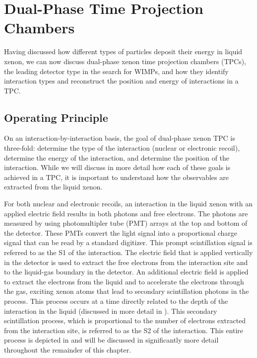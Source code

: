\section{Dual-Phase Time Projection Chambers}
\label{sec:lxe_tpc}

Having discussed how different types of particles deposit their energy in liquid xenon, we can now discuss dual-phase xenon time projection chambers (TPCs), the leading detector type in the search for WIMPs, and how they identify interaction types and reconstruct the position and energy of interactions in a TPC.



\subsection{Operating Principle}
\label{sec:tpc_operating_principle}

On an interaction-by-interaction basis, the goal of dual-phase xenon TPC is three-fold: determine the type of the interaction (nuclear or electronic recoil), determine the energy of the interaction, and determine the position of the interaction.  While we will discuss in more detail how each of these goals is achieved in a TPC, it is important to understand how the observables are extracted from the liquid xenon.  

For both nuclear and electronic recoils, an interaction in the liquid xenon with an applied electric field results in both photons and free electrons.  The photons are measured by using photomultipler tube (PMT) arrays at the top and bottom of the detector.  These PMTs convert the light signal into a proportional charge signal that can be read by a standard digitizer.  This prompt scintillation signal is referred to as the S1 of the interaction.  The electric field that is applied vertically in the detector is used to extract the free electrons from the interaction site and to the liquid-gas boundary in the detector.  An additional electric field is applied to extract the electrons from the liquid and to accelerate the electrons through the gas, exciting xenon atoms that lead to secondary scintillation photons in the process.  This process occurs at a time directly related to the depth of the interaction in the liquid (discussed in more detail in ).  This secondary scintillation process, which is proportional to the number of electrons extracted from the interaction site, is referred to as the S2 of the interaction.  This entire process is depicted in  and will be discussed in significantly more detail throughout the remainder of this chapter.

